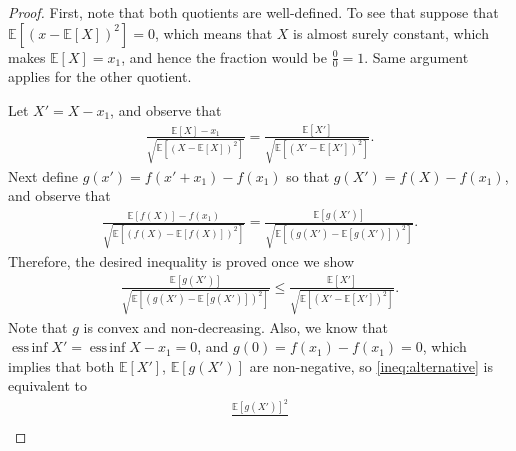 \documentclass[letter, 12pt]{report}
\newcommand{\essinf}{\operatorname{ess\,inf}}
\newcommand{\E}{\mathbb E}
\newcommand{\1}{\mathbf{1}}
\theoremstyle{plain}
\theoremstyle{definition}
\theoremstyle{remark}
\begin{document}
\begin{proof}
    First, note that both quotients are well-defined.
    To see that suppose that $\E[(x-\E[X])^2] =0$, which means that $X$ is almost surely constant, which makes $\E[X]= x_1$, and hence the fraction would be $\tfrac{0}{0}=1$. Same argument applies for the other quotient.

    Let $X' = X - x_1$,
    and observe that
    \begin{align*}
        \frac{
            \E[X] - x_1
        }{
            \sqrt{
                \E\left[
                    \left(X - \E[X]\right)^2
                    \right]
            }
        }
        =
        \frac{
            \E[X']
        }{
            \sqrt{
                \E\left[
                    \left(X' - \E[X']\right)^2
                    \right]
            }
        }.
    \end{align*}
    Next define $g(x')=f(x' + x_1) - f(x_1)$ so that
    $g(X') = f(X) - f(x_1)$, and observe that
    \begin{align*}
        \frac{
            \E[f(X)] - f(x_1)
        }{
            \sqrt{
                \E\left[
                    \left(f(X) - \E[f(X)]\right)^2
                    \right]
            }
        }
        =
        \frac{
            \E[g(X')]
        }{
            \sqrt{
                \E\left[
                    \left(g(X')
                    - \E[g(X')]\right)^2
                    \right]
            }
        }.
    \end{align*}
    Therefore, the desired inequality is
    proved once we show
    \begin{align}
        \frac{
            \E[g(X')]
        }{
            \sqrt{
                \E\left[
                    \left(g(X')
                    - \E[g(X')]\right)^2
                    \right]
            }
        }
        \leq
        \frac{
            \E[X']
        }{
            \sqrt{
                \E\left[
                    \left(X' - \E[X']\right)^2
                    \right]
            }
        }.
        \label{ineq:alternative}
    \end{align}
    Note that $g$ is convex and non-decreasing.
    Also, we know that $\essinf X' = \essinf X - x_1 = 0$,
    and $g(0) = f(x_1) - f(x_1) = 0$,
    which implies that both $\E[X']$, $\E[g(X')]$ are non-negative,
    so \cref{ineq:alternative} is equivalent to
    \begin{align*}
        \frac{
            \E[g(X')]^2
        }{
}
\end{align*}
\end{proof}
\end{document}
